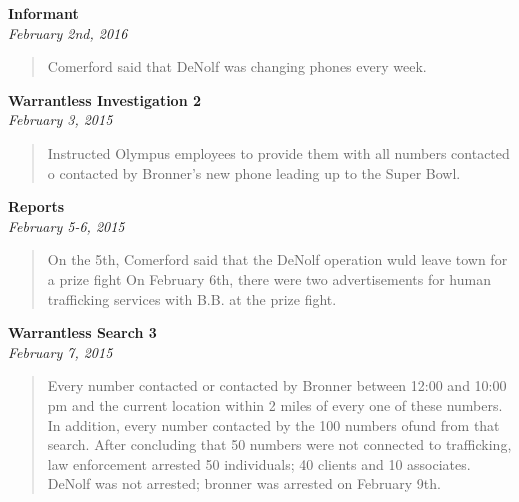 \documentclass[paper=letter,fontsize=10pt]{article}
\newcommand{\inv}[3]{\noindent \textbf{#1} \\ \noindent \textit{#2} \begin{quote} #3 \end{quote} \par}
\begin{document}
\inv{Informant}{February 2nd, 2016} {
	Comerford said that DeNolf was changing phones every week.
}
\inv{Warrantless Investigation 2}{February 3, 2015} {
	Instructed Olympus employees to provide them with all numbers contacted o contacted by Bronner’s new phone leading up to the Super Bowl.
}
\inv{Reports}{February 5-6, 2015} {
		On the 5th, Comerford said that the DeNolf operation wuld leave town for a prize fight
		On February 6th, there were two advertisements for human trafficking services with B.B. at the prize fight.
}
\inv{Warrantless Search 3}{February 7, 2015} {
	Every number contacted or contacted by Bronner between 12:00 and 10:00 pm and the current location within 2 miles of every one of these numbers. In addition, every number contacted by the 100 numbers ofund from that search. After concluding that 50 numbers were not connected to trafficking, law enforcement arrested 50 individuals; 40 clients and 10 associates. DeNolf was not arrested; bronner was arrested on February 9th.
}
\end{document}

